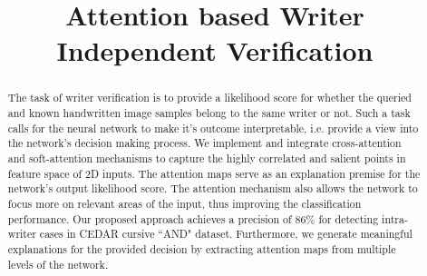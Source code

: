 \documentclass[a4paper,conference]{IEEEtran}
\begin{document}
\title{Attention based Writer Independent Verification}

\author{
}

\maketitle

\begin{abstract}
The task of writer verification is to provide a likelihood score for whether the queried and known handwritten image samples belong to the same writer or not. Such a task calls for the neural network to make it's outcome interpretable, i.e. provide a view into the network's decision making process.  We implement and integrate cross-attention and soft-attention mechanisms to capture the highly correlated and salient points in feature space of 2D inputs. The attention maps serve as an  explanation premise for the network's output likelihood score. The attention mechanism also allows the network to focus more on relevant areas of the input, thus improving the classification performance. Our proposed approach achieves a precision of 86\% for detecting intra-writer cases in CEDAR cursive ``AND" dataset. Furthermore, we generate meaningful explanations for the provided decision by extracting attention maps from multiple levels of the network.
\end{abstract}






\IEEEpeerreviewmaketitle
\end{document}
